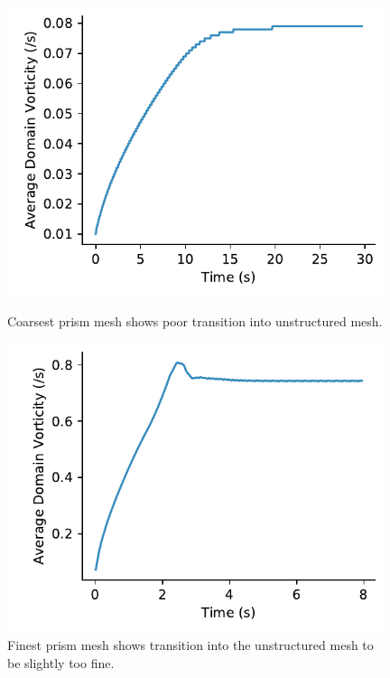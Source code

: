 \documentclass[10pt,english]{article}
\begin{document}
\begin{figure}[h]
\centering
\begin{minipage}{.49\textwidth}
  \centering
\includegraphics[trim={0.0cm 0cm 0.0cm 0cm},clip,width=0.98\textwidth]{Ave_20}
\caption{Coarsest prism mesh shows poor transition into unstructured mesh.}
\label{f:Ave_20}
\end{minipage}%
\hspace{5pt}
\begin{minipage}{.49\textwidth}
  \centering
\includegraphics[trim={0.0cm 0cm 0.0cm 0cm},clip,width=0.98\textwidth]{Ave_150}
\caption{\vspace{0pt}Finest prism mesh shows transition into the unstructured mesh to be slightly too fine.}
\label{f:Ave_150}
\end{minipage}
\end{figure}
\end{document}
